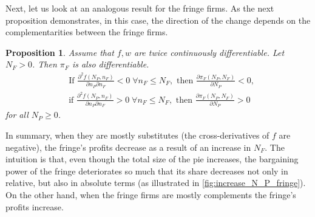 \documentclass[a4paper]{article}
\newtheorem{proposition}{Proposition}
\begin{document}
Next, let us look at an analogous result for the fringe firms.
As the next proposition demonstrates, in this case, the direction of the change depends on the complementarities between the fringe firms.
\begin{proposition}
    \label{prop:share_of_fringe}
    Assume that $f, w$ are twice continuously differentiable.
    Let $N_F > 0$.
    Then $\pi_F$ is also differentiable.
    \begin{align*}
        &\text{If } \frac{\partial^2 f(N_P, n_F)}{\partial n_P \partial n_F} < 0 \;\forall n_F \leq N_F, \text{ then } \frac{\partial \pi_F(N_P, N_F)}{\partial N_P} < 0, \\
        &\text{if } \frac{\partial^2 f(N_P, n_F)}{\partial n_P \partial n_F} > 0 \;\forall n_F \leq N_F, \text{ then } \frac{\partial \pi_F(N_P, N_F)}{\partial N_P} > 0
    \end{align*}
    for all $N_P \geq 0$.
\end{proposition}
In summary, when they are mostly substitutes (the cross-derivatives of $f$ are negative), the fringe's profits decrease as a result of an increase in $N_F$.
The intuition is that, even though the total size of the pie increases, the bargaining power of the fringe deteriorates so much that its share decreases not only in relative, but also in absolute terms (as illustrated in \cref{fig:increase_N_P_fringe}).
On the other hand, when the fringe firms are mostly complements the fringe's profits increase.
\end{document}
